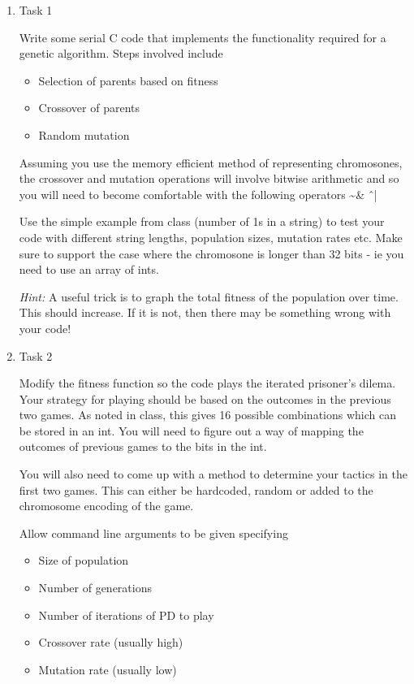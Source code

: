 \documentclass[paper=a4, fontsize=11pt]{scrartcl} %
\numberwithin{equation}{section} %
\numberwithin{figure}{section} %
\numberwithin{table}{section} %
\begin{document}
\begin{enumerate}


\item{Task 1}

Write some serial C code that implements the functionality required for a genetic algorithm. Steps involved include

\begin{itemize}
\item{Selection of parents based on fitness}
\item{Crossover of parents}
\item{Random mutation}
\end{itemize}

Assuming you use the memory efficient method of representing chromosones, the crossover and mutation operations will involve bitwise arithmetic and so you will need to become comfortable with the following operators \textasciitilde \& \^ \ |


Use the simple example from class (number of 1s in a string) to test your code with different string lengths, population sizes, mutation rates etc. Make sure to support the case where the chromosone is longer than 32 bits - ie you need to use an array of ints.

\textit{Hint:} A useful trick is to graph the total fitness of the population over time. This should increase. If it is not, then there may be something wrong with your code!

\item{Task 2}

Modify the fitness function so the code plays the iterated prisoner's dilema. Your strategy for playing should be based on the outcomes in the previous two games. As noted in class, this gives 16 possible combinations which can be stored in an int. You will need to figure out a way of mapping the outcomes of previous games to the bits in the int.

You will also need to come up with a method to determine your tactics in the first two games. This can either be hardcoded, random or added to the chromosome encoding of the game.

Allow command line arguments to be given specifying

\begin{itemize}
\item{Size of population}
\item{Number of generations}
\item{Number of iterations of PD to play}
\item{Crossover rate (usually high)}
\item{Mutation rate (usually low)}
\end{itemize}


\end{enumerate}
\end{document}
